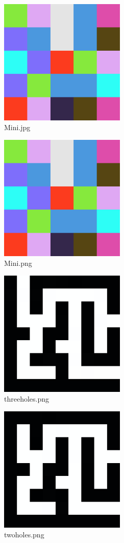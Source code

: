 \documentclass[titlepage]{article}
\begin{document}
\begin{figure}[H]
  \centering
  \includegraphics[width=6cm]{mini.png}
  \caption{Mini.jpg}
  \label{fig:dijk}
\end{figure}

\begin{figure}[H]
  \centering
  \includegraphics[width=6cm]{mini.png}
  \caption{Mini.png}
  \label{fig:dijk}
\end{figure}

\begin{figure}[H]
  \centering
  \includegraphics[width=6cm]{threeholes.png}
  \caption{threeholes.png}
  \label{fig:dijk}
\end{figure}

\begin{figure}[H]
  \centering
  \includegraphics[width=6cm]{twoholes.png}
  \caption{twoholes.png}
  \label{fig:dijk}
\end{figure}
\end{document}
